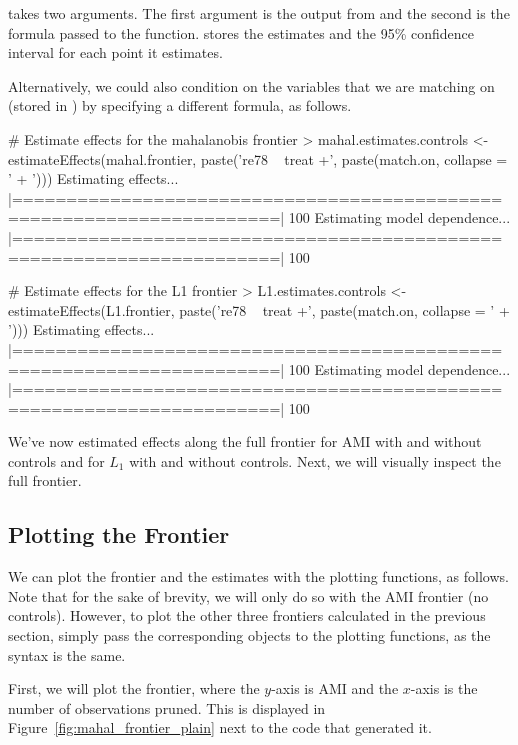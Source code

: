 \documentclass[nojss]{jss}
\begin{document}
 takes two arguments. The first argument is
the output from  and the second is the formula
passed to the  function.  stores the
estimates and the 95\% confidence interval for each point it
estimates.

Alternatively, we could also condition on the variables that we are
matching on (stored in ) by specifying a different
formula, as follows.

\begin{CodeChunk}
\begin{CodeInput}
# Estimate effects for the mahalanobis frontier
> mahal.estimates.controls <- 
        estimateEffects(mahal.frontier, paste('re78 ~ treat +', 
                                        paste(match.on, collapse = ' + ')))
Estimating effects...
  |======================================================================| 100%
Estimating model dependence...
  |======================================================================| 100%

# Estimate effects for the L1 frontier
> L1.estimates.controls <- 
     estimateEffects(L1.frontier, paste('re78 ~ treat +', 
                                  paste(match.on, collapse = ' + ')))
Estimating effects...
  |======================================================================| 100%
Estimating model dependence...
  |======================================================================| 100%

\end{CodeInput}
\end{CodeChunk}

We've now estimated effects along the full frontier for AMI with and
without controls and for $L_1$ with and without controls. Next, we
will visually inspect the full frontier.

\subsection{Plotting the Frontier}

We can plot the frontier and the estimates with the plotting
functions, as follows. Note that for the sake of brevity, we will only
do so with the AMI frontier (no controls). However, to plot the other
three frontiers calculated in the previous section, simply pass the
corresponding objects to the plotting functions, as the syntax is the
same.

First, we will plot the frontier, where the $y$-axis is AMI and the
$x$-axis is the number of observations pruned. This is displayed in
Figure~\ref{fig:mahal_frontier_plain} next to the code that generated
it.
\end{document}
